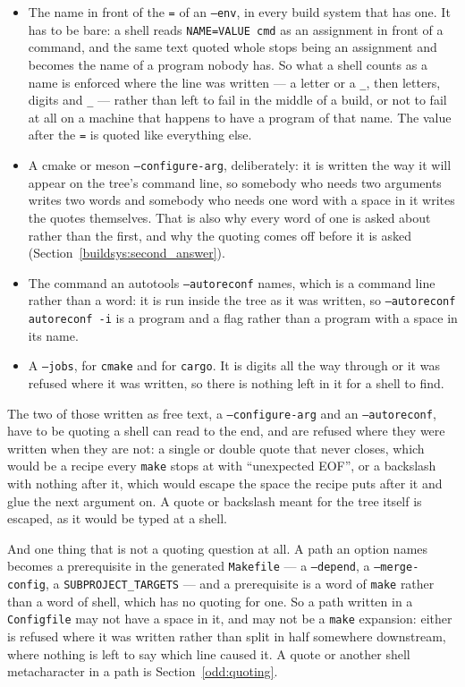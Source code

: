 \documentclass{article}
\begin{document}
\begin{itemize}
\item The name in front of the \texttt{=} of an \texttt{--env}, in
  every build system that has one.  It has to be bare: a shell reads
  \texttt{NAME=VALUE cmd} as an assignment in front of a command, and
  the same text quoted whole stops being an assignment and becomes the
  name of a program nobody has.  So what a shell counts as a name is
  enforced where the line was written --- a letter or a
  \texttt{\_}, then letters, digits and \texttt{\_} --- rather than
  left to fail in the middle of a build, or not to fail at all on a
  machine that happens to have a program of that name.  The value
  after the \texttt{=} is quoted like everything else.

\item A cmake or meson \texttt{--configure-arg}, deliberately: it is
  written the way it will appear on the tree's command line, so
  somebody who needs two arguments writes two words and somebody who
  needs one word with a space in it writes the quotes themselves.
  That is also why every word of one is asked about rather than the
  first, and why the quoting comes off before it is asked
  (Section~\ref{buildsys:second_answer}).

\item The command an autotools \texttt{--autoreconf} names, which is a
  command line rather than a word: it is run inside the tree as it was
  written, so \texttt{--autoreconf autoreconf -i} is a program and a
  flag rather than a program with a space in its name.

\item A \texttt{--jobs}, for \texttt{cmake} and for \texttt{cargo}.
  It is digits all the way through or it was refused where it was
  written, so there is nothing left in it for a shell to find.
\end{itemize}

The two of those written as free text, a \texttt{--configure-arg} and
an \texttt{--autoreconf}, have to be quoting a shell can read to the
end, and are refused where they were written when they are not: a
single or double quote that never closes, which would be a recipe
every \texttt{make} stops at with ``unexpected EOF'', or a backslash
with nothing after it, which would escape the space the recipe puts
after it and glue the next argument on.  A quote or backslash meant
for the tree itself is escaped, as it would be typed at a shell.

And one thing that is not a quoting question at all.  A path an option
names becomes a prerequisite in the generated \texttt{Makefile} --- a
\texttt{--depend}, a \texttt{--merge-config}, a
\texttt{SUBPROJECT\_TARGETS} --- and a prerequisite is a word of
\texttt{make} rather than a word of shell, which has no quoting for
one.  So a path written in a \texttt{Configfile} may not have a space
in it, and may not be a \texttt{make} expansion: either is refused
where it was written rather than split in half somewhere downstream,
where nothing is left to say which line caused it.  A quote or another
shell metacharacter in a path is Section~\ref{odd:quoting}.
\end{document}
